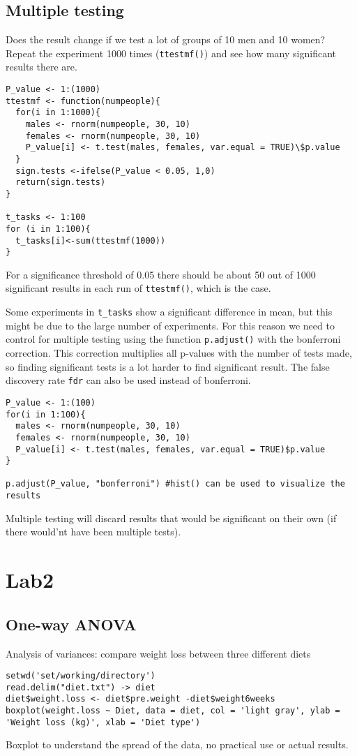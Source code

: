 \documentclass{article}
\theoremstyle{definition}
\begin{document}
\subsection{Multiple testing}
Does the result change if we test a lot of groups of 10 men and 10 women? Repeat the experiment 1000 times (\texttt{ttestmf()}) and see how many significant results there are. 
\begin{lstlisting}
P_value <- 1:(1000)
ttestmf <- function(numpeople){
  for(i in 1:1000){
    males <- rnorm(numpeople, 30, 10)
    females <- rnorm(numpeople, 30, 10)
    P_value[i] <- t.test(males, females, var.equal = TRUE)\$p.value
  }  
  sign.tests <-ifelse(P_value < 0.05, 1,0)
  return(sign.tests)
}

t_tasks <- 1:100
for (i in 1:100){
  t_tasks[i]<-sum(ttestmf(1000))
}
\end{lstlisting}
For a significance threshold of 0.05 there should be about 50 out of 1000 significant results in each run of \texttt{ttestmf()}, which is the case. \par 
Some experiments in \texttt{t\_tasks} show a significant difference in mean, but this might be due to the large number of experiments. For this reason we need to control for multiple testing using the function \texttt{p.adjust()} with the bonferroni correction. This correction multiplies all p-values with the number of tests made, so finding significant tests is a lot harder to find significant result. The false discovery rate \texttt{fdr} can also be used instead of bonferroni.
\begin{lstlisting}
P_value <- 1:(100)
for(i in 1:100){
  males <- rnorm(numpeople, 30, 10)
  females <- rnorm(numpeople, 30, 10)
  P_value[i] <- t.test(males, females, var.equal = TRUE)$p.value
}

p.adjust(P_value, "bonferroni") #hist() can be used to visualize the results
\end{lstlisting}

Multiple testing will discard results that would be significant on their own (if there would'nt have been multiple tests).


\section{Lab2}
\subsection{One-way ANOVA}
Analysis of variances: compare weight loss between three different diets
\begin{lstlisting}
setwd('set/working/directory')
read.delim("diet.txt") -> diet
diet$weight.loss <- diet$pre.weight -diet$weight6weeks
boxplot(weight.loss ~ Diet, data = diet, col = 'light gray', ylab = 'Weight loss (kg)', xlab = 'Diet type')
\end{lstlisting}
Boxplot to understand the spread of the data, no practical use or actual results.
\end{document}
